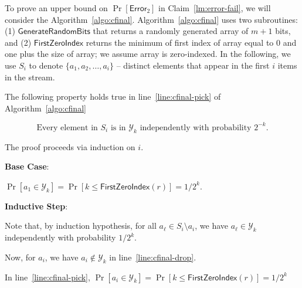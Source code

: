 \documentclass[a4paper,UKenglish,cleveref, autoref, thm-restate]{lipics-v2021}
\makeatletter
\newenvironment{proof*}[1][\proofname]{\par
  \pushQED{\qed}
  \normalfont \partopsep=\z@skip \topsep=\z@skip
  \trivlist
  \item[\hskip\labelsep
        \itshape
    #1\@addpunct{.}]\ignorespaces
}{
  \popQED\endtrivlist\@endpefalse
}
\newcommand{\Error}{\mathsf{Error}}
\makeatother
\begin{document}
To prove an upper bound on  $\Pr [\Error_{2}]$ in Claim~\ref{lm:error-fail}, we will consider the Algorithm~\ref{algo:cfinal}. Algorithm~\ref{algo:cfinal}  uses two subroutines: (1) $\mathsf{GenerateRandomBits}$ that returns a randomly generated array of $m+1$ bits, and (2) $\mathsf{FirstZeroIndex}$ returns the minimum of first index of array equal to $0$ and one plus the size of array;  we assume array is zero-indexed.
In the following, we use $S_i$ to denote $\{a_1,a_2,\ldots, a_i\}$ -- distinct elements that appear in the first $i$ items  in the stream. 




\begin{claim}\label{cl:loop}
The following property holds true 
in line~\ref{line:cfinal-pick} of Algorithm~\ref{algo:cfinal}


\[
\mbox{
Every element in $S_i$ is in $\mathcal{Y}_{k}$ independently with probability $2^{-k}$.
} 
\]







\end{claim}

\begin{proof*}









The proof proceeds via induction on $i$. 

\medskip
\noindent\textbf{Base Case}: 

$\Pr[a_1 \in \mathcal{Y}_{k}] = \Pr[k \leq \mathsf{FirstZeroIndex}(r)] = 1/2^k$. 


\noindent\textbf{Inductive Step}:

Note that, by induction hypothesis, for all $a_{\ell} \in S_i \setminus a_i$, we have $a_{\ell} \in  \mathcal{Y}_{k}$ independently with probability $1/2^k$. 


Now, for $a_i$, we have $a_i \notin \mathcal{Y}_{k}$ in line~\ref{line:cfinal-drop}.






In line~\ref{line:cfinal-pick},
$\Pr [a_i \in \mathcal{Y}_{k}] = \Pr[k \leq \mathsf{FirstZeroIndex}(r)] = 1/2^k$  \qedhere 



\end{proof*}

\
\end{document}
